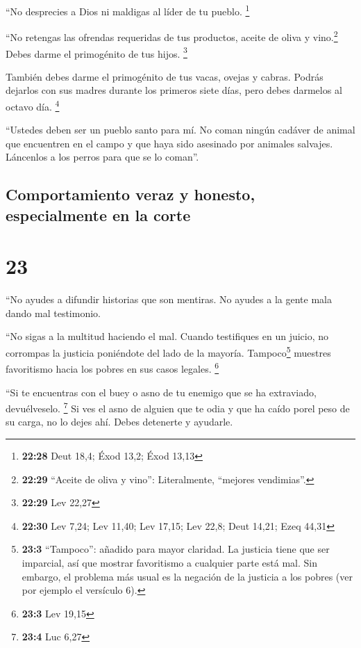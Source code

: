  ``No desprecies a Dios ni maldigas al líder de tu
pueblo. \footnote{\textbf{22:28} Deut 18,4; Éxod 13,2; Éxod 13,13}

 ``No retengas las ofrendas requeridas de tus productos,
aceite de oliva y vino.\footnote{\textbf{22:29} ``Aceite de oliva y
  vino'': Literalmente, ``mejores vendimias''.} Debes darme el
primogénito de tus hijos. \footnote{\textbf{22:29} Lev 22,27}

 También debes darme el primogénito de tus vacas, ovejas
y cabras. Podrás dejarlos con sus madres durante los primeros siete
días, pero debes darmelos al octavo día. \footnote{\textbf{22:30} Lev
  7,24; Lev 11,40; Lev 17,15; Lev 22,8; Deut 14,21; Ezeq 44,31}

 ``Ustedes deben ser un pueblo santo para mí. No coman
ningún cadáver de animal que encuentren en el campo y que haya sido
asesinado por animales salvajes. Láncenlos a los perros para que se lo
coman''.

\hypertarget{comportamiento-veraz-y-honesto-especialmente-en-la-corte}{%
\subsection{Comportamiento veraz y honesto, especialmente en la
corte}\label{comportamiento-veraz-y-honesto-especialmente-en-la-corte}}

\hypertarget{section-22}{%
\section{23}\label{section-22}}

 ``No ayudes a difundir historias que son mentiras. No
ayudes a la gente mala dando mal testimonio.

 ``No sigas a la multitud haciendo el mal. Cuando
testifiques en un juicio, no corrompas la justicia poniéndote del lado
de la mayoría.  Tampoco\footnote{\textbf{23:3}
  ``Tampoco'': añadido para mayor claridad. La justicia tiene que ser
  imparcial, así que mostrar favoritismo a cualquier parte está mal. Sin
  embargo, el problema más usual es la negación de la justicia a los
  pobres (ver por ejemplo el versículo 6).} muestres favoritismo hacia
los pobres en sus casos legales. \footnote{\textbf{23:3} Lev 19,15}

 ``Si te encuentras con el buey o asno de tu enemigo que
se ha extraviado, devuélveselo. \footnote{\textbf{23:4} Luc 6,27}
 Si ves el asno de alguien que te odia y que ha caído
porel peso de su carga, no lo dejes ahí. Debes detenerte y ayudarle.

